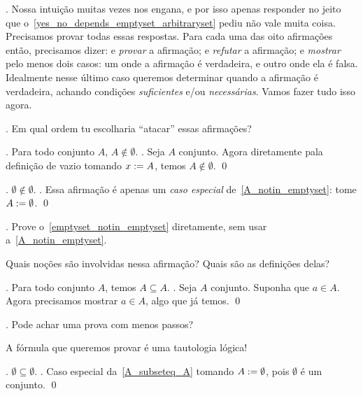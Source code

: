 \endexercise

\beware.
Nossa intuição muitas vezes nos engana, e por isso apenas responder no jeito
que o~\ref{yes_no_depends_emptyset_arbitraryset} pediu não vale muita coisa.
Precisamos provar todas essas respostas.  Para cada uma das oito afirmações
então, precisamos dizer:
\beginul
{} e \emph{provar} a afirmação;
 e \emph{refutar} a afirmação;
 e \emph{mostrar} pelo menos dois casos:
um onde a afirmação é verdadeira, e outro onde ela é falsa.
Idealmente nesse último caso queremos determinar quando a afirmação é verdadeira,
achando condições \emph{suficientes} e/ou \emph{necessárias}.
\endul
\noindent
Vamos fazer tudo isso agora.

\exercise.
\label{attack_order}%
Em qual ordem tu escolharia ``atacar'' essas afirmações?

\endexercise

\proposition.
\label{A_notin_emptyset}
Para todo conjunto $A$, $A \notin \emptyset$.
\proof.
Seja $A$ conjunto.  Agora diretamente pala definição de vazio
tomando $x\mathrel{:=} A$, temos $A \notin \emptyset$.
\qed

\corollary.
\label{emptyset_notin_emptyset}%
$\emptyset \notin \emptyset$.
\proof.
Essa afirmação é apenas um \emph{caso especial} de~\ref{A_notin_emptyset}:
tome $A \mathrel{:=} \emptyset$.
\qed

\exercise.
\label{emptyset_notin_emptyset_direct_proof}%
Prove o~\ref{emptyset_notin_emptyset} diretamente, sem usar a~\ref{A_notin_emptyset}.

\hint
Quais noções são involvidas nessa afirmação?
Quais são as definições delas?

\endexercise

\proposition.
\label{A_subseteq_A}%
Para todo conjunto $A$, temos $A \subseteq A$.
\proof.
Seja $A$ conjunto.  Suponha que $a \in A$.
Agora precisamos mostrar $a\in A$, algo que já temos.
\qed

\exercise.
Pode achar uma prova com menos passos?

\solution
A fórmula que queremos provar é uma tautologia lógica!

\endexercise

\corollary.
\label{emptyset_subseteq_emptyset}%
$\emptyset\subseteq\emptyset$.
\proof.
Caso especial da~\ref{A_subseteq_A} tomando $A\mathrel{:=} \emptyset$,
pois $\emptyset$ é um conjunto.
\qed

